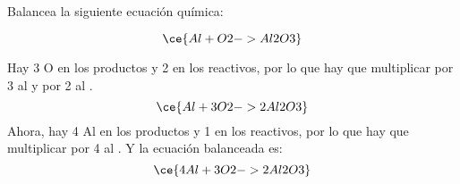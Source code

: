 Balancea la siguiente ecuación química:

\[
    \ce{Al + O2 -> Al2O3 }
\]

\begin{solutionbox}{4cm}
    Hay 3 O en los productos y 2 en los reactivos, por lo que hay que multiplicar por 3 al  y por 2 al .
    \[
        \ce{Al + 3O2 -> 2Al2O3}
    \]
    Ahora, hay 4 Al en los productos y 1 en los reactivos, por lo que hay que multiplicar por 4 al . Y la ecuación balanceada es:
    \[
        \ce{4Al + 3O2 -> 2Al2O3}
    \]
\end{solutionbox}
